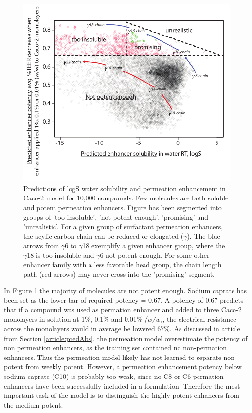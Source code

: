 \begin{figure}[!htbp]
\includegraphics[width=\textwidth,height=\textheight,keepaspectratio]{graphics/screened_molecules3.pdf}
\caption{Predictions of logS water solubility and permeation enhancement in Caco-2 model for 10,000 compounds. Few molecules are both soluble and potent permeation enhancers. Figure has been segmented into groups of 'too insoluble', 'not potent enough', 'promising' and 'unrealistic'. For a given group of surfactant permeation enhancers, the acylic carbon chain can be reduced or elongated ($\gamma$). The blue arrows from $\gamma$6 to $\gamma$18 exemplify a given enhancer group, where the $\gamma$18 is too insoluble and $\gamma$6 not potent enough. For some other enhancer family with a less favorable head group, the chain length path (red arrows) may never cross into the 'promising' segment.}
\label{predictionsCombined}
\end{figure}

In Figure \ref{predictionsCombined} the majority of molecules are not potent enough. Sodium caprate has been set as the lower bar of required potency = 0.67. A potency of 0.67 predicts that if a compound was used as permation enhancer and added to three Caco-2 monolayers in solution at 1\%, 0.1\% and 0.01\% \textit{(w/w)}, the electrical resistance across the monolayers would in average be lowered 67\%. As discussed in article from Section \ref{article:predAbs}, the permeation model overestimate the potency of non permeation enhancers, as the training set contained no non-permation enhancers. Thus the permeation model likely has not learned to separate non potent from weekly potent. However, a permeation enhancement potency below sodium caprate (C10) is probably too weak, since no C8 or C6 permation enhancers have been successfully included in a formulation. Therefore the most important task of the model is to distinguish the highly potent enhancers from the medium potent.

